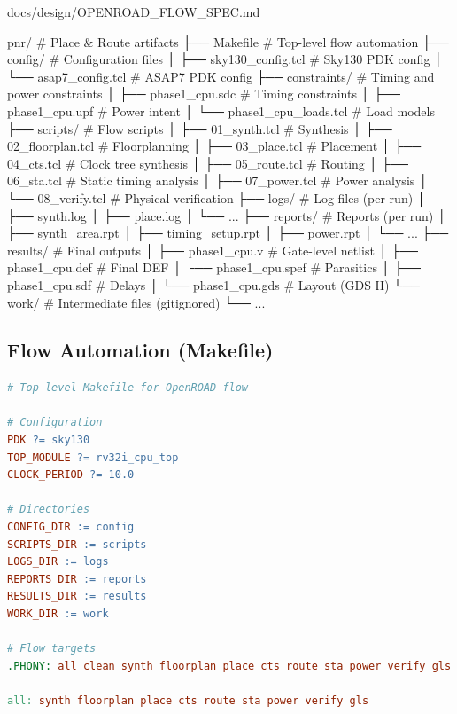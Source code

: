 \begin{relocated}{docs/design/OPENROAD_FLOW_SPEC.md}
\begin{textblock}
pnr/                            # Place & Route artifacts
├── Makefile                    # Top-level flow automation
├── config/                     # Configuration files
│   ├── sky130_config.tcl       # Sky130 PDK config
│   └── asap7_config.tcl        # ASAP7 PDK config
├── constraints/                # Timing and power constraints
│   ├── phase1_cpu.sdc          # Timing constraints
│   ├── phase1_cpu.upf          # Power intent
│   └── phase1_cpu_loads.tcl    # Load models
├── scripts/                    # Flow scripts
│   ├── 01_synth.tcl            # Synthesis
│   ├── 02_floorplan.tcl        # Floorplanning
│   ├── 03_place.tcl            # Placement
│   ├── 04_cts.tcl              # Clock tree synthesis
│   ├── 05_route.tcl            # Routing
│   ├── 06_sta.tcl              # Static timing analysis
│   ├── 07_power.tcl            # Power analysis
│   └── 08_verify.tcl           # Physical verification
├── logs/                       # Log files (per run)
│   ├── synth.log
│   ├── place.log
│   └── ...
├── reports/                    # Reports (per run)
│   ├── synth_area.rpt
│   ├── timing_setup.rpt
│   ├── power.rpt
│   └── ...
├── results/                    # Final outputs
│   ├── phase1_cpu.v            # Gate-level netlist
│   ├── phase1_cpu.def          # Final DEF
│   ├── phase1_cpu.spef         # Parasitics
│   ├── phase1_cpu.sdf          # Delays
│   └── phase1_cpu.gds          # Layout (GDS II)
└── work/                       # Intermediate files (gitignored)
    └── ...
\end{textblock}

\subsection{Flow Automation (Makefile)}\label{tm:pd:openroad-flow:flow-automation-makefile}

\begin{lstlisting}[language=make]
# Top-level Makefile for OpenROAD flow

# Configuration
PDK ?= sky130
TOP_MODULE ?= rv32i_cpu_top
CLOCK_PERIOD ?= 10.0

# Directories
CONFIG_DIR := config
SCRIPTS_DIR := scripts
LOGS_DIR := logs
REPORTS_DIR := reports
RESULTS_DIR := results
WORK_DIR := work

# Flow targets
.PHONY: all clean synth floorplan place cts route sta power verify gls

all: synth floorplan place cts route sta power verify gls


\end{lstlisting}
\end{relocated}
